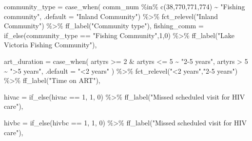 \documentclass[
  letterpaper,
  DIV=11,
  numbers=noendperiod]{scrartcl}
\newenvironment{Shaded}{\begin{snugshade}}{\end{snugshade}}
\newcommand{\AttributeTok}[1]{\textcolor[rgb]{0.40,0.45,0.13}{#1}}
\newcommand{\DecValTok}[1]{\textcolor[rgb]{0.68,0.00,0.00}{#1}}
\newcommand{\FunctionTok}[1]{\textcolor[rgb]{0.28,0.35,0.67}{#1}}
\newcommand{\NormalTok}[1]{\textcolor[rgb]{0.00,0.23,0.31}{#1}}
\newcommand{\SpecialCharTok}[1]{\textcolor[rgb]{0.37,0.37,0.37}{#1}}
\newcommand{\StringTok}[1]{\textcolor[rgb]{0.13,0.47,0.30}{#1}}
\begin{document}
\begin{Shaded}
\begin{Highlighting}[]
     \AttributeTok{community\_type =} \FunctionTok{case\_when}\NormalTok{(}
\NormalTok{       comm\_num }\SpecialCharTok{\%in\%} \FunctionTok{c}\NormalTok{(}\DecValTok{38}\NormalTok{,}\DecValTok{770}\NormalTok{,}\DecValTok{771}\NormalTok{,}\DecValTok{774}\NormalTok{) }\SpecialCharTok{\textasciitilde{}} \StringTok{"Fishing community"}\NormalTok{,}
       \AttributeTok{.default =} \StringTok{"Inland Community"}\NormalTok{) }\SpecialCharTok{\%\textgreater{}\%} 
       \FunctionTok{fct\_relevel}\NormalTok{(}\StringTok{"Inland Community"}\NormalTok{) }\SpecialCharTok{\%\textgreater{}\%} 
       \FunctionTok{ff\_label}\NormalTok{(}\StringTok{"Community type"}\NormalTok{),}
     \AttributeTok{fishing\_comm =} \FunctionTok{if\_else}\NormalTok{(community\_type }\SpecialCharTok{==} \StringTok{"Fishing Community"}\NormalTok{,}\DecValTok{1}\NormalTok{,}\DecValTok{0}\NormalTok{) }\SpecialCharTok{\%\textgreater{}\%} 
       \FunctionTok{ff\_label}\NormalTok{(}\StringTok{"Lake Victoria Fishing Community"}\NormalTok{),}
     
     \AttributeTok{art\_duration =} \FunctionTok{case\_when}\NormalTok{(}
\NormalTok{       artyrs }\SpecialCharTok{\textgreater{}=} \DecValTok{2} \SpecialCharTok{\&}\NormalTok{  artyrs }\SpecialCharTok{\textless{}=} \DecValTok{5} \SpecialCharTok{\textasciitilde{}} \StringTok{"2{-}5 years"}\NormalTok{,}
\NormalTok{       artyrs }\SpecialCharTok{\textgreater{}} \DecValTok{5} \SpecialCharTok{\textasciitilde{}} \StringTok{"\textgreater{}5 years"}\NormalTok{,}
       \AttributeTok{.default =}  \StringTok{"\textless{}2 years"}
\NormalTok{     ) }\SpecialCharTok{\%\textgreater{}\%} 
       \FunctionTok{fct\_relevel}\NormalTok{(}\StringTok{"\textless{}2 years"}\NormalTok{,}\StringTok{"2{-}5 years"}\NormalTok{) }\SpecialCharTok{\%\textgreater{}\%} 
       \FunctionTok{ff\_label}\NormalTok{(}\StringTok{"Time on ART"}\NormalTok{),}
     
     \AttributeTok{hivac =} \FunctionTok{if\_else}\NormalTok{(hivac }\SpecialCharTok{==} \DecValTok{1}\NormalTok{, }\DecValTok{1}\NormalTok{, }\DecValTok{0}\NormalTok{) }\SpecialCharTok{\%\textgreater{}\%} 
       \FunctionTok{ff\_label}\NormalTok{(}\StringTok{"Missed scheduled visit for HIV care"}\NormalTok{),}
     
     \AttributeTok{hivbc =} \FunctionTok{if\_else}\NormalTok{(hivbc }\SpecialCharTok{==} \DecValTok{1}\NormalTok{, }\DecValTok{1}\NormalTok{, }\DecValTok{0}\NormalTok{) }\SpecialCharTok{\%\textgreater{}\%} 
       \FunctionTok{ff\_label}\NormalTok{(}\StringTok{"Missed scheduled visit for HIV care"}\NormalTok{),}
     

\end{Highlighting}
\end{Shaded}
\end{document}
